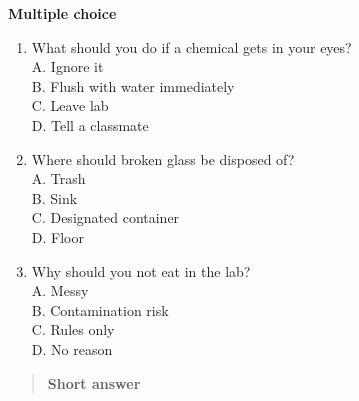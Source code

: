 \documentclass[
  letterpaper,
  DIV=11,
  numbers=noendperiod]{scrreprt}
\begin{document}
\textbf{Multiple choice}

\begin{enumerate}
\def\labelenumi{\arabic{enumi}.}
\item
  What should you do if a chemical gets in your eyes?\\
  A. Ignore it\\
  B. Flush with water immediately\\
  C. Leave lab\\
  D. Tell a classmate
\item
  Where should broken glass be disposed of?\\
  A. Trash\\
  B. Sink\\
  C. Designated container\\
  D. Floor
\item
  Why should you not eat in the lab?\\
  A. Messy\\
  B. Contamination risk\\
  C. Rules only\\
  D. No reason
\end{enumerate}

\begin{quote}
\textbf{Short answer}
\end{quote}
\end{document}
